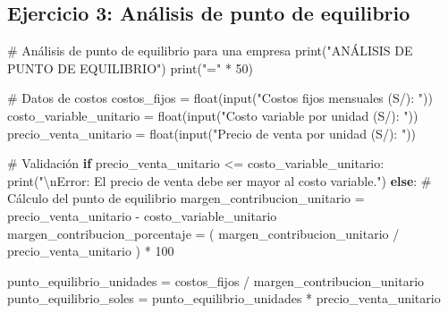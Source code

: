 \documentclass[
  doc,
  floatsintext,
  longtable,
  a4paper,
  nolmodern,
  notxfonts,
  notimes,
  12pt,
  colorlinks=true,linkcolor=blue,citecolor=blue,urlcolor=blue]{apa7}
\newenvironment{Shaded}{\begin{snugshade}}{\end{snugshade}}
\newcommand{\BuiltInTok}[1]{\textcolor[rgb]{0.00,0.23,0.31}{#1}}
\newcommand{\CharTok}[1]{\textcolor[rgb]{0.13,0.47,0.30}{#1}}
\newcommand{\CommentTok}[1]{\textcolor[rgb]{0.37,0.37,0.37}{#1}}
\newcommand{\ControlFlowTok}[1]{\textcolor[rgb]{0.00,0.23,0.31}{\textbf{#1}}}
\newcommand{\DecValTok}[1]{\textcolor[rgb]{0.68,0.00,0.00}{#1}}
\newcommand{\NormalTok}[1]{\textcolor[rgb]{0.00,0.23,0.31}{#1}}
\newcommand{\OperatorTok}[1]{\textcolor[rgb]{0.37,0.37,0.37}{#1}}
\newcommand{\StringTok}[1]{\textcolor[rgb]{0.13,0.47,0.30}{#1}}
\begin{document}
\subsection{Ejercicio 3: Análisis de punto de
equilibrio}\label{ejercicio-3-anuxe1lisis-de-punto-de-equilibrio}

\begin{Shaded}
\begin{Highlighting}[]
\CommentTok{\# Análisis de punto de equilibrio para una empresa}
\BuiltInTok{print}\NormalTok{(}\StringTok{"ANÁLISIS DE PUNTO DE EQUILIBRIO"}\NormalTok{)}
\BuiltInTok{print}\NormalTok{(}\StringTok{"="} \OperatorTok{*} \DecValTok{50}\NormalTok{)}

\CommentTok{\# Datos de costos}
\NormalTok{costos\_fijos }\OperatorTok{=} \BuiltInTok{float}\NormalTok{(}\BuiltInTok{input}\NormalTok{(}\StringTok{"Costos fijos mensuales (S/): "}\NormalTok{))}
\NormalTok{costo\_variable\_unitario }\OperatorTok{=} \BuiltInTok{float}\NormalTok{(}\BuiltInTok{input}\NormalTok{(}\StringTok{"Costo variable por unidad (S/): "}\NormalTok{))}
\NormalTok{precio\_venta\_unitario }\OperatorTok{=} \BuiltInTok{float}\NormalTok{(}\BuiltInTok{input}\NormalTok{(}\StringTok{"Precio de venta por unidad (S/): "}\NormalTok{))}

\CommentTok{\# Validación}
\ControlFlowTok{if}\NormalTok{ precio\_venta\_unitario }\OperatorTok{\textless{}=}\NormalTok{ costo\_variable\_unitario:}
    \BuiltInTok{print}\NormalTok{(}\StringTok{"}\CharTok{\textbackslash{}n}\StringTok{Error: El precio de venta debe ser mayor al costo variable."}\NormalTok{)}
\ControlFlowTok{else}\NormalTok{:}
    \CommentTok{\# Cálculo del punto de equilibrio}
\NormalTok{    margen\_contribucion\_unitario }\OperatorTok{=}\NormalTok{ precio\_venta\_unitario }\OperatorTok{{-}}\NormalTok{ costo\_variable\_unitario}
\NormalTok{    margen\_contribucion\_porcentaje }\OperatorTok{=}\NormalTok{ (}
\NormalTok{        margen\_contribucion\_unitario }\OperatorTok{/}\NormalTok{ precio\_venta\_unitario}
\NormalTok{    ) }\OperatorTok{*} \DecValTok{100}

\NormalTok{    punto\_equilibrio\_unidades }\OperatorTok{=}\NormalTok{ costos\_fijos }\OperatorTok{/}\NormalTok{ margen\_contribucion\_unitario}
\NormalTok{    punto\_equilibrio\_soles }\OperatorTok{=}\NormalTok{ punto\_equilibrio\_unidades }\OperatorTok{*}\NormalTok{ precio\_venta\_unitario}


\end{Highlighting}
\end{Shaded}
\end{document}
